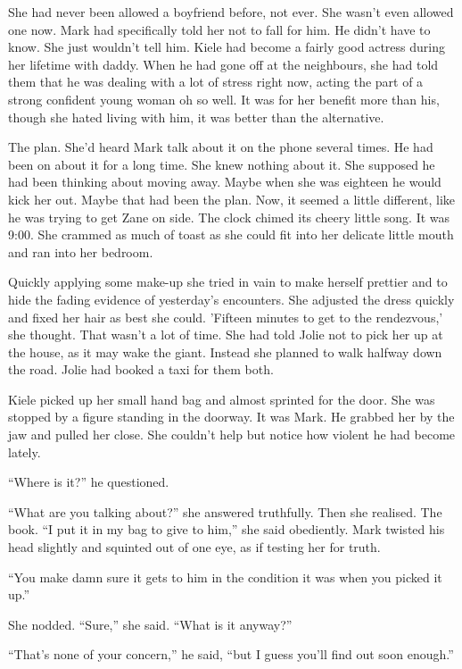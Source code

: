 She had never been allowed a boyfriend before, not ever.  She wasn't even allowed one now.  Mark had specifically told her not to fall for him.  He didn't have to know.  She just wouldn't tell him.  Kiele had become a fairly good actress during her lifetime with daddy.  When he had gone off at the neighbours, she had told them that he was dealing with a lot of stress right now, acting the part of a strong confident young woman oh so well.  It was for her benefit more than his, though she hated living with him, it was better than the alternative.

The plan.  She'd heard Mark talk about it on the phone several times.  He had been on about it for a long time.  She knew nothing about it.  She supposed he had been thinking about moving away.  Maybe when she was eighteen he would kick her out.  Maybe that had been the plan.  Now, it seemed a little different, like he was trying to get Zane on side.  The clock chimed its cheery little song.  It was 9:00.  She crammed as much of toast as she could fit into her delicate little mouth and ran into her bedroom.  

Quickly applying some make-up she tried in vain to make herself prettier and to hide the fading evidence of yesterday's encounters.  She adjusted the dress quickly and fixed her hair as best she could.  'Fifteen minutes to get to the rendezvous,' she thought.  That wasn't a lot of time.  She had told Jolie not to pick her up at the house, as it may wake the giant.  Instead she planned to walk halfway down the road.  Jolie had booked a taxi for them both.  

Kiele picked up her small hand bag and almost sprinted for the door.  She was stopped by a figure standing in the doorway.  It was Mark.  He grabbed her by the jaw and pulled her close.  She couldn't help but notice how violent he had become lately.  

``Where is it?'' he questioned.  

``What are you talking about?'' she answered truthfully.  Then she realised.  The book.  ``I put it in my bag to give to him,'' she said obediently.  Mark twisted his head slightly and squinted out of one eye, as if testing her for truth.  

``You make damn sure it gets to him in the condition it was when you picked it up.''

She nodded.  ``Sure,'' she said.  ``What is it anyway?''

``That's none of your concern,'' he said, ``but I guess you'll find out soon enough.''

